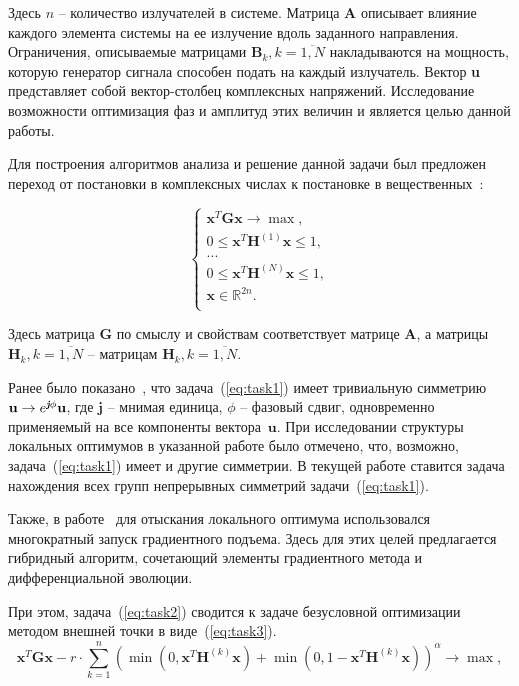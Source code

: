 \documentclass{llncs}
\begin{document}
Здесь $n$ -- количество излучателей в системе. Матрица $\textbf{A}$ описывает влияние каждого элемента системы на ее излучение вдоль заданного направления. Ограничения, описываемые матрицами $\textbf{B}_k, k = \overline{1,N}$ накладываются на мощность, которую генератор сигнала способен подать на каждый излучатель. Вектор \textbf{u} представляет собой вектор-столбец комплексных напряжений. Исследование возможности оптимизация фаз и амплитуд этих величин и является целью данной работы.

Для построения алгоритмов анализа и решение данной задачи был предложен переход от постановки в комплексных числах к постановке в вещественных~\cite{tyunin:daor}:

\begin{equation}
    \begin{cases}
       \textbf{x}^{T}\textbf{Gx} \rightarrow \max,\\
       0 \leq \textbf{x}^{T}\textbf{H}^{(1)}\textbf{x} \leq 1,\\
       ...\\
       0 \leq \textbf{x}^{T}\textbf{H}^{(N)}\textbf{x} \leq 1,\\
      \textbf{x} \in \mathbb{R}^{2n}.\\
     \end{cases}
     \label{eq:task2}
\end{equation}

Здесь матрица $\textbf{G}$ по смыслу и свойствам соответствует матрице $\textbf{A}$, а матрицы $\textbf{H}_k, k = \overline{1,N}$ -- матрицам $\textbf{H}_k, k = \overline{1,N}$.

Ранее было показано~\cite{tyunin:daor}, что задача~(\ref{eq:task1}) имеет тривиальную симметрию $\textbf{u} \to e^{\emph{\textbf{j}}\phi}\textbf{u}$, где $\textbf{j}$ -- мнимая единица, $\phi$ -- фазовый сдвиг, одновременно применяемый на все компоненты вектора~$\textbf{u}$. При исследовании структуры локальных оптимумов в указанной работе было отмечено, что, возможно, задача~(\ref{eq:task1}) имеет и другие симметрии. В текущей работе ставится задача нахождения всех групп непрерывных симметрий задачи~(\ref{eq:task1}).

Также, в работе~\cite{tyunin:daor} для отыскания локального оптимума использовался многократный запуск градиентного подъема. Здесь для этих целей предлагается гибридный алгоритм, сочетающий элементы градиентного метода и дифференциальной эволюции.

При этом, задача~(\ref{eq:task2}) сводится к задаче безусловной оптимизации методом внешней точки в виде~(\ref{eq:task3}).
\begin{equation}
       \textbf{x}^{T}\textbf{Gx} - r\cdot \sum_{k=1}^n
       \left( \min\left(0,\textbf{x}^{T}\textbf{H}^{(k)}\textbf{x}\right) +
       \min\left(0,1-\textbf{x}^{T}\textbf{H}^{(k)}\textbf{x}\right)\right)^{\alpha} \rightarrow
       \max,
     \label{eq:task3}
\end{equation}
\end{document}
